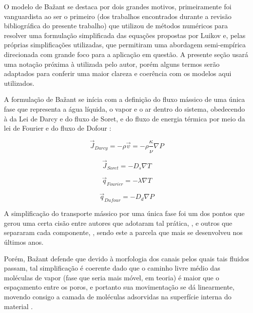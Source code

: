O modelo de Ba\v{z}ant se destaca por dois grandes motivos, primeiramente foi
vanguardista ao ser o primeiro (dos trabalhos encontrados durante a revisão
bibliográfica do presente trabalho) que utilizou de métodos numéricos para
resolver uma formulação simplificada das equações propostas por Luikov e, pelas
próprias simplificações utilizadas, que permitiram uma abordagem semi-empírica
direcionada com grande foco para a aplicação em questão. A presente seção usará
uma notação próxima à utilizada pelo autor, porém alguns termos serão adaptados
para conferir uma maior clareza e coerência com os modelos aqui utilizados.

A formulação de Ba\v{z}ant se inícia com a definição do fluxo mássico de
uma única fase que representa a água líquida, o vapor e o ar dentro do sistema,
obedecendo à da Lei de Darcy e do fluxo de Soret, e do fluxo de energia térmica
por meio da lei de Fourier e do fluxo de Dofour \cite{bazant1978thermal,
  bazant1978, bavzant1982, bazant1979}:

\begin{equation}
  \label{eq:Darcy}
  \vec{J}_{Darcy} = - \rho \vec{v} = - \rho \frac{\kappa }{\nu} \nabla P 
\end{equation}

\begin{equation}
  \label{eq:Soret}
  \vec{J}_{Soret} = - D_s \nabla T
\end{equation}

\begin{equation}
  \label{eq:Fourier}
  \vec{q}_{Fourier} = - \lambda \nabla T 
\end{equation}

\begin{equation}
  \label{eq:Dufour}
  \vec{q}_{Dufour} = - D_d \nabla P
\end{equation}

A simplificação do transporte mássico por uma única fase foi um dos pontos que
gerou uma certa cisão entre autores que adotaram tal prática, \cite{Gong1995a,
  Gong1991, Abdel-Rahman1996}, e outros que separaram cada componente,
\cite{Pesavento2013, Gawin2003, Gawin2004, Gawin1999, Fey2016b, Davie2006a,
  Davie2012a}, sendo este a parcela que mais se desenvolveu nos últimos anos.

Porém, Ba\v{z}ant defende que devido à morfologia dos canais pelos quais tais
fluidos passam, tal simplificação é coerente dado que o caminho livre médio das
moléculas de vapor (fase que seria mais móvel, em teoria) é maior que o
espaçamento entre os poros, e portanto sua movimentação se dá linearmente,
movendo consigo a camada de moléculas adsorvidas na superfície interna do
material \cite{bavzant2018creep}.

